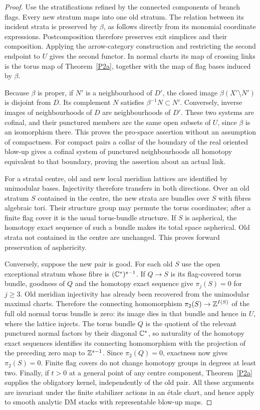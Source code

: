 \begin{proof}
Use the stratifications refined by the connected components of branch flags.
Every new stratum maps into one old stratum.  The relation between its incident
strata is preserved by $\beta$, as follows directly from its monomial coordinate
expressions.  Postcomposition therefore preserves exit simplices and their
composition.  Applying the arrow-category construction and restricting the
second endpoint to $U$ gives the second functor.  In normal charts its map of
crossing links is the torus map of Theorem~\ref{P2a}, together with the map of
flag bases induced by $\beta$.

Because $\beta$ is proper, if $N'$ is a neighbourhood of $D'$, the closed image
$\beta(X'\setminus N')$ is disjoint from $D$.  Its complement $N$ satisfies
$\beta^{-1}N\subset N'$.  Conversely, inverse images of neighbourhoods of $D$
are neighbourhoods of $D'$.  These two systems are cofinal, and their punctured
members are the same open subsets of $U$, since $\beta$ is an isomorphism there.
This proves the pro-space assertion without an assumption of compactness.
For compact pairs a collar of the boundary of the real oriented blow-up gives
a cofinal system of punctured neighbourhoods all homotopy equivalent to that
boundary, proving the assertion about an actual link.

For a stratal centre, old and new local meridian lattices are identified by
unimodular bases.  Injectivity therefore transfers in both directions.  Over
an old stratum $S$ contained in the centre, the new strata are bundles over $S$
with fibres algebraic tori.  Their structure group may permute the torus
coordinates; after a finite flag cover it is the usual torus-bundle structure.
If $S$ is aspherical, the homotopy exact sequence of such a bundle makes its
total space aspherical.  Old strata not contained in the centre are unchanged.
This proves forward preservation of asphericity.

Conversely, suppose the new pair is good.  For each old $S$ use the open
exceptional stratum whose fibre is $(\mathbb C^*)^{s-1}$.  If $Q\to S$ is its
flag-covered torus bundle, goodness of $Q$ and the homotopy exact sequence give
$\pi_j(S)=0$ for $j\geq3$.  Old meridian injectivity has already been recovered
from the unimodular maximal charts.  Therefore the connecting homomorphism
$\pi_2(S)\to\mathbb Z^{I(S)}$ of the full old normal torus bundle is zero: its image
dies in that bundle and hence in $U$, where the lattice injects.  The torus
bundle $Q$ is the quotient of the relevant punctured normal factors by their
diagonal $\mathbb C^*$, so naturality of the homotopy exact sequences identifies its
connecting homomorphism with the projection of the preceding zero map to
$\mathbb Z^{s-1}$.  Since $\pi_2(Q)=0$, exactness now gives $\pi_2(S)=0$.
Finite flag covers do not change homotopy groups in degrees at least two.
Finally, if $t>0$ at a general point of any centre component,
Theorem~\ref{P2a} supplies the obligatory kernel, independently of the old pair.
All these arguments are invariant under the finite stabilizer actions in an
\'etale chart, and hence apply to smooth analytic DM stacks with representable
blow-up maps.
\end{proof}

